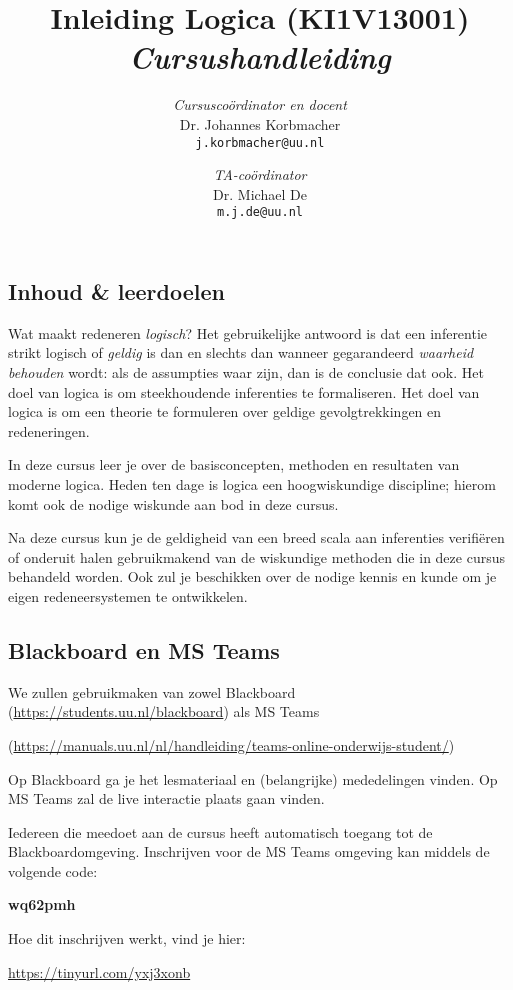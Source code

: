 \documentclass[a4paper,11pt]{article}
\title{Inleiding Logica (KI1V13001) \\[2ex] \emph{Cursushandleiding}}
\author{\emph{Cursuscoördinator en docent}\\[1ex]Dr. Johannes Korbmacher\\ \texttt{j.korbmacher@uu.nl} \and \emph{TA-coördinator}\\[1ex] Dr. Michael De\\ \texttt{m.j.de@uu.nl}}
\begin{document}
\maketitle
\thispagestyle{empty}

\subsection*{Inhoud \& leerdoelen}

Wat maakt redeneren \emph{logisch}?
Het gebruikelijke antwoord is dat een inferentie strikt logisch of \emph{geldig} is dan en slechts dan wanneer gegarandeerd \emph{waarheid behouden} wordt: als de assumpties waar zijn, dan is de conclusie dat ook.
Het doel van logica is om steekhoudende inferenties te formaliseren.
Het doel van logica is om een theorie te formuleren over geldige gevolgtrekkingen en redeneringen. 

In deze cursus leer je over de basisconcepten, methoden en resultaten van moderne logica.
Heden ten dage is logica een hoogwiskundige discipline; hierom komt ook de nodige wiskunde aan bod in deze cursus.

Na deze cursus kun je de geldigheid van een breed scala aan inferenties verifiëren of onderuit halen gebruikmakend van de wiskundige methoden die in deze cursus behandeld worden.
Ook zul je beschikken over de nodige kennis en kunde om je eigen redeneersystemen te ontwikkelen.

\subsection*{Blackboard en MS Teams}
\label{sec:ms-teams}

We zullen gebruikmaken van zowel Blackboard (\url{https://students.uu.nl/blackboard}) als MS Teams \begin{center}
(\url{https://manuals.uu.nl/nl/handleiding/teams-online-onderwijs-student/})
\end{center}

Op Blackboard ga je het lesmateriaal en (belangrijke) mededelingen vinden.
Op MS Teams zal de live interactie plaats gaan vinden.

Iedereen die meedoet aan de cursus heeft automatisch toegang tot de Blackboardomgeving.
Inschrijven voor de MS Teams omgeving kan middels de volgende code:
\begin{center}
  \textbf{wq62pmh}
\end{center}
Hoe dit inschrijven werkt, vind je hier:
\begin{center}
  \url{https://tinyurl.com/yxj3xonb}
\end{center}
\end{document}
